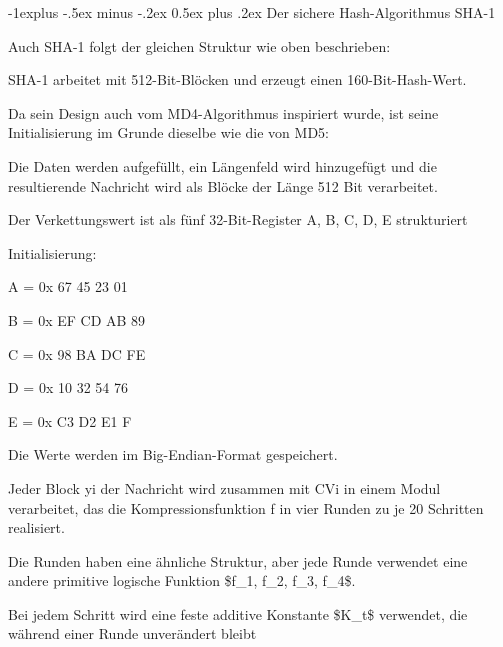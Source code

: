 \documentclass[a4paper]{article}
\makeatletter
\renewcommand{\subsection}{\@startsection{subsection}{2}{0mm}%
 {-1explus -.5ex minus -.2ex}%
 {0.5ex plus .2ex}%
 {\normalfont\normalsize\bfseries}}
\makeatother
\begin{document}
\begin{multicols}{3}
      \subsection{Der sichere Hash-Algorithmus
            SHA-1}

      \begin{itemize*}
            \item
            Auch SHA-1 folgt der gleichen Struktur wie oben beschrieben:

            \begin{itemize*}
                  \item SHA-1 arbeitet mit 512-Bit-Blöcken und erzeugt einen 160-Bit-Hash-Wert.
                  \item Da sein Design auch vom MD4-Algorithmus inspiriert wurde, ist seine Initialisierung im Grunde dieselbe wie die von MD5:
                  \begin{itemize*} \item Die Daten werden aufgefüllt, ein Längenfeld wird hinzugefügt und die resultierende Nachricht wird als Blöcke der Länge 512 Bit verarbeitet. \item Der Verkettungswert ist als fünf 32-Bit-Register A, B, C, D, E strukturiert \item Initialisierung:
                        \begin{itemize*} \item A = 0x 67 45 23 01 \item B = 0x EF CD AB 89 \item C = 0x 98 BA DC FE \item D = 0x 10 32 54 76 \item E = 0x C3 D2 E1 F \end{itemize*} \item Die Werte werden im Big-Endian-Format gespeichert. \end{itemize*}
                  \item Jeder Block yi der Nachricht wird zusammen mit CVi in einem Modul verarbeitet, das die Kompressionsfunktion f in vier Runden zu je 20 Schritten realisiert.
                  \begin{itemize*} \item Die Runden haben eine ähnliche Struktur, aber jede Runde verwendet eine andere primitive logische Funktion \$f\_1, f\_2, f\_3, f\_4\$. \item Bei jedem Schritt wird eine feste additive Konstante \$K\_t\$ verwendet, die während einer Runde unverändert bleibt \end{itemize*}
            \end{itemize*}


\end{itemize*}
\end{multicols}
\end{document}

